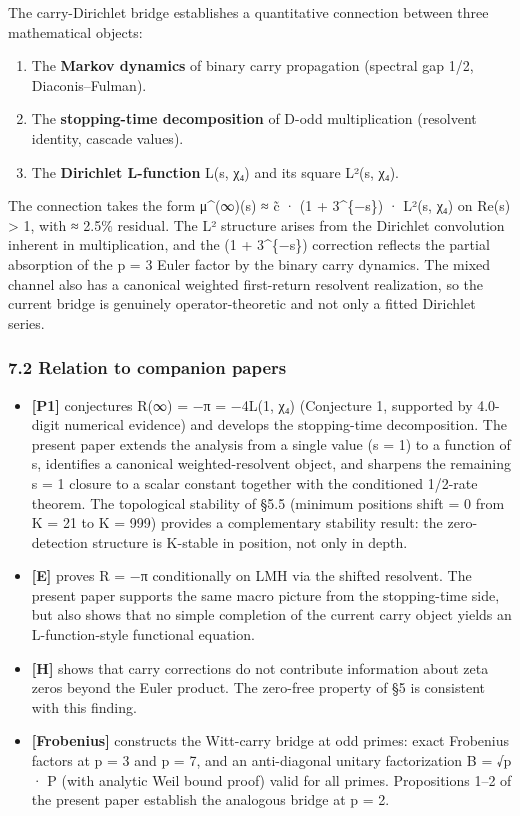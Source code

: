 \documentclass[
  11pt,
]{article}
\providecommand{\tightlist}{%
  \setlength{\itemsep}{0pt}\setlength{\parskip}{0pt}}
\begin{document}
The carry-Dirichlet bridge establishes a quantitative connection between three
mathematical objects:

\begin{enumerate}
\def\labelenumi{\arabic{enumi}.}
\tightlist
\item
  The \textbf{Markov dynamics} of binary carry propagation (spectral gap 1/2,
  Diaconis--Fulman).
\item
  The \textbf{stopping-time decomposition} of D-odd multiplication (resolvent
  identity, cascade values).
\item
  The \textbf{Dirichlet L-function} L(s, χ₄) and its square L²(s, χ₄).
\end{enumerate}

The connection takes the form μ\^{}(∞)(s) ≈ c̃ · (1 + 3\^{}\{−s\}) · L²(s, χ₄) on
Re(s) \textgreater{} 1, with ≈ 2.5\% residual. The L² structure arises from the
Dirichlet convolution inherent in multiplication, and the (1 + 3\^{}\{−s\})
correction reflects the partial absorption of the p = 3 Euler factor by the
binary carry dynamics. The mixed channel also has a canonical weighted
first-return resolvent realization, so the current bridge is genuinely
operator-theoretic and not only a fitted Dirichlet series.

\subsubsection{7.2 Relation to companion
papers}\label{relation-to-companion-papers}

\begin{itemize}
\tightlist
\item
  \textbf{{[}P1{]}} conjectures R(∞) = −π = −4L(1, χ₄) (Conjecture 1, supported
  by 4.0-digit numerical evidence) and develops the stopping-time decomposition.
  The present paper extends the analysis from a single value (s = 1) to a
  function of s, identifies a canonical weighted-resolvent object, and sharpens
  the remaining s = 1 closure to a scalar constant together with the conditioned
  1/2-rate theorem. The topological stability of §5.5 (minimum positions shift =
  0 from K = 21 to K = 999) provides a complementary stability result: the
  zero-detection structure is K-stable in position, not only in depth.
\item
  \textbf{{[}E{]}} proves R = −π conditionally on LMH via the shifted resolvent.
  The present paper supports the same macro picture from the stopping-time side,
  but also shows that no simple completion of the current carry object yields an
  L-function-style functional equation.
\item
  \textbf{{[}H{]}} shows that carry corrections do not contribute information
  about zeta zeros beyond the Euler product. The zero-free property of §5 is
  consistent with this finding.
\item
  \textbf{{[}Frobenius{]}} constructs the Witt-carry bridge at odd primes: exact
  Frobenius factors at p = 3 and p = 7, and an anti-diagonal unitary
  factorization B = √p · P (with analytic Weil bound proof) valid for all
  primes. Propositions 1--2 of the present paper establish the analogous bridge
  at p = 2.
\end{itemize}
\end{document}
